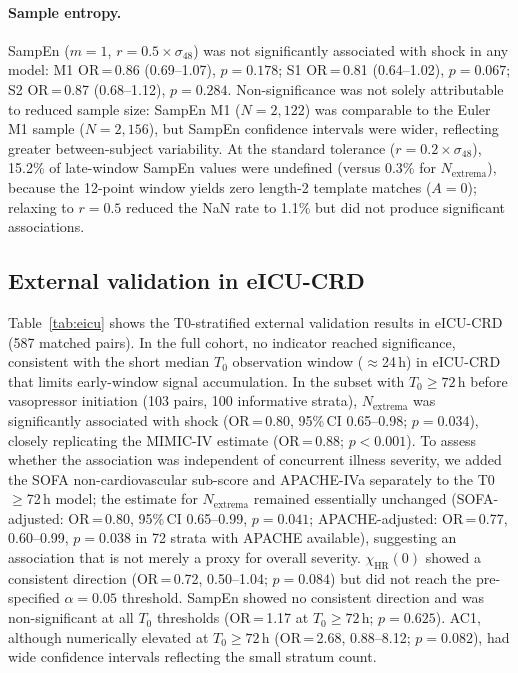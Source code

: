 \documentclass[12pt,a4paper]{article}
\begin{document}
\paragraph{Sample entropy.}
SampEn ($m=1$, $r=0.5\times\sigma_{48}$) was not significantly associated
with shock in any model: M1 OR\,=\,0.86 (0.69--1.07), $p=0.178$;
S1 OR\,=\,0.81 (0.64--1.02), $p=0.067$;
S2 OR\,=\,0.87 (0.68--1.12), $p=0.284$.
Non-significance was not solely attributable to reduced sample size:
SampEn M1 ($N=2{,}122$) was comparable to the Euler M1 sample
($N=2{,}156$), but SampEn confidence intervals were wider, reflecting
greater between-subject variability.
At the standard tolerance ($r=0.2\times\sigma_{48}$), 15.2\% of
late-window SampEn values were undefined (versus 0.3\% for
$N_{\text{extrema}}$), because the 12-point window yields zero
length-2 template matches ($A=0$); relaxing to $r=0.5$ reduced the
NaN rate to 1.1\% but did not produce significant associations.

\subsection{External validation in eICU-CRD}
\label{sec:res-eicu}

Table~\ref{tab:eicu} shows the T0-stratified external validation results
in eICU-CRD (587 matched pairs).
In the full cohort, no indicator reached significance, consistent with
the short median $T_0$ observation window ($\approx$24\,h) in eICU-CRD
that limits early-window signal accumulation.
In the subset with $T_0 \geq 72$\,h before vasopressor initiation
(103 pairs, 100 informative strata), $N_{\text{extrema}}$ was
significantly associated with shock (OR\,=\,0.80, 95\%\,CI 0.65--0.98;
$p=0.034$), closely replicating the MIMIC-IV estimate (OR\,=\,0.88;
$p<0.001$).
To assess whether the association was independent of concurrent illness
severity, we added the SOFA non-cardiovascular sub-score and APACHE-IVa
separately to the T0$\geq$72\,h model; the estimate for $N_{\text{extrema}}$
remained essentially unchanged (SOFA-adjusted: OR\,=\,0.80, 95\%\,CI
0.65--0.99, $p=0.041$; APACHE-adjusted: OR\,=\,0.77, 0.60--0.99,
$p=0.038$ in 72 strata with APACHE available), suggesting an association
that is not merely a proxy for overall severity.
$\chi_{\text{HR}}(0)$ showed a consistent direction (OR\,=\,0.72,
0.50--1.04; $p=0.084$) but did not reach the pre-specified $\alpha=0.05$
threshold.
SampEn showed no consistent direction and was non-significant at all
$T_0$ thresholds (OR\,=\,1.17 at $T_0\geq 72$\,h; $p=0.625$).
AC1, although numerically elevated at $T_0\geq 72$\,h
(OR\,=\,2.68, 0.88--8.12; $p=0.082$), had wide confidence intervals
reflecting the small stratum count.
\end{document}
